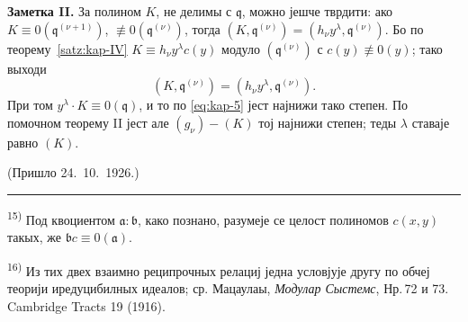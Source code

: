 \documentclass[11pt]{article}
\newcommand{\foreign}[1]{#1}
\theoremstyle{plain}
\begin{document}
\textbf{Заметка II.} За полином $K$, не делимы с $\mathfrak{q}$,
можно јешче тврдити: ако
$K \equiv 0(\mathfrak{q}^{(\nu+1)})$,
$\not\equiv 0(\mathfrak{q}^{(\nu)})$, тогда
$(K, \mathfrak{q}^{(\nu)}) = (h_{\nu}y^{\lambda}, \mathfrak{q}^{(\nu)})$.
Бо по теорему~\ref{satz:kap-IV}
$K \equiv h_{\nu}y^{\lambda}c(y)$ модуло
$(\mathfrak{q}^{(\nu)})$ с $c(y) \not\equiv 0(y)$; тако выходи
\[
(K, \mathfrak{q}^{(\nu)}) = (h_{\nu}y^{\lambda}, \mathfrak{q}^{(\nu)}).
\]
При том $y^{\lambda} \cdot K \equiv 0(\mathfrak{q})$, и то по
\eqref{eq:kap-5} јест најнижи тако степен. По помочном теорему II
јест але $(g_{\nu}) - (K)$ тој најнижи степен; теды $\lambda$ ставаје
равно $(K)$.

\vfill
\begin{flushright}
(Пришло 24.\ 10.\ 1926.)
\end{flushright}

\vspace{0.5em}
\noindent\rule{\textwidth}{0.4pt}
\vspace{0.3em}

{\footnotesize
\textsuperscript{15)} Под квоциентом $\mathfrak{a}:\mathfrak{b}$, како познано,
разумеје се целост полиномов $c(x,y)$ такых, же
$\mathfrak{b}c \equiv 0(\mathfrak{a})$.

\textsuperscript{16)} Из тих двех взаимно реципрочных релациј једна условјује
другу по обчеј теорији иредуцибилных идеалов; ср. Мацаулаы,
\textit{Модулар Сыстемс}, Нр.\,72 и 73. \foreign{Cambridge Tracts} 19 (1916).
}
\end{document}
